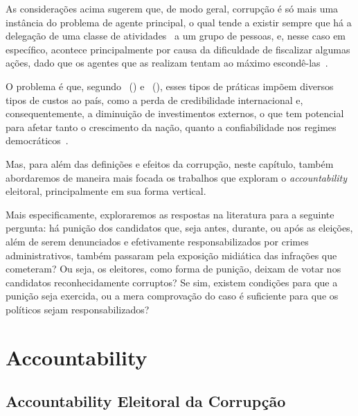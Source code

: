 \documentclass[
	12pt,				%
	openright,			%
	twoside,			%
	a4paper,			%
	openany,
	english,			%
	brazil				%
	]{abntex2}
\begin{document}
As considerações acima sugerem que, de modo geral, corrupção é só mais uma instância do problema de agente principal, o qual tende a existir sempre que há a delegação de uma classe de atividades~\cite{Rose-Ackerman1978} a um grupo de pessoas, e, nesse caso em específico, acontece principalmente por causa da dificuldade de fiscalizar algumas ações, dado que os agentes que as realizam tentam ao máximo escondê-las~\cite{Treisman2000Jun, Rose-Ackerman1996Sep}.

O problema é que, segundo ~(\citeyear{Rose-Ackerman1996Sep}) e ~(\citeyear{Kunicova2005Oct}), esses tipos de práticas impõem diversos tipos de custos ao país, como a perda de credibilidade internacional e, consequentemente, a diminuição de investimentos externos, o que tem potencial para afetar tanto o crescimento da nação, quanto a confiabilidade nos regimes democráticos~\cite{Boas2019Apr}.

Mas, para além das definições e efeitos da corrupção, neste capítulo, também abordaremos de maneira mais focada os trabalhos que exploram o \textit{accountability} eleitoral, principalmente em sua forma vertical.

Mais especificamente, exploraremos as respostas na literatura para a seguinte pergunta: há punição dos candidatos que, seja antes, durante, ou após as eleições, além de serem denunciados e efetivamente responsabilizados por crimes administrativos, também passaram pela exposição midiática das infrações que cometeram? Ou seja, os eleitores, como forma de punição, deixam de votar nos candidatos reconhecidamente corruptos? Se sim, existem condições para que a punição seja exercida, ou a mera comprovação do caso é suficiente para que os políticos sejam responsabilizados?

\section{Accountability}


\subsection{Accountability Eleitoral da Corrupção}
\end{document}
